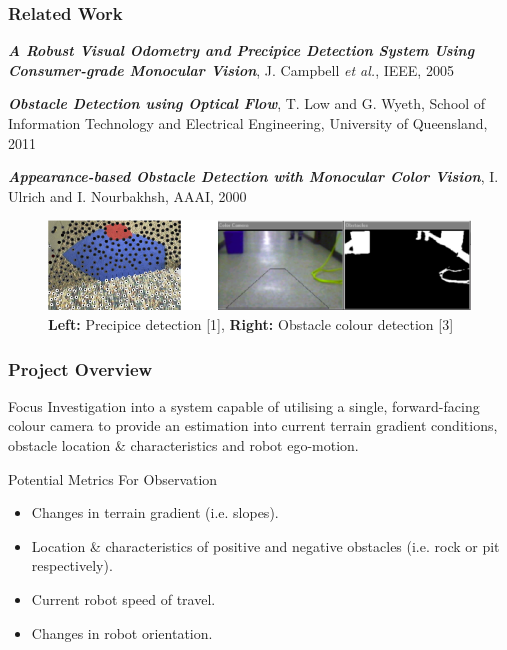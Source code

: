 \documentclass[10pt, compress]{beamer}
\begin{document}
\begin{frame}[fragile]
  \frametitle{Related Work}
  
  	\begin{enumerate}[label={[\arabic*]}]
  	
  		\item \textbf{\textit{A Robust Visual Odometry and Precipice Detection
System Using Consumer-grade Monocular Vision}}, J. Campbell \textit{et al.}, IEEE, 2005

		\item \textbf{\textit{Obstacle Detection using Optical Flow}}, T. Low and G. Wyeth, School of Information Technology and Electrical Engineering, University of Queensland, 2011
		
		\item \textbf{\textit{Appearance-based Obstacle Detection with Monocular Color Vision}}, I. Ulrich and I. Nourbakhsh, AAAI, 2000
  			
  	\end{enumerate}
  	
  	\vspace{5pt}
  	
  	
  	\begin{figure}[ht!]
\centering
\includegraphics[scale=0.3]{related_work.png}
    \caption{\textbf{Left:} Precipice detection [1], \textbf{Right:} Obstacle colour detection [3]}
  \end{figure}

  	
\end{frame}

\begin{frame}[fragile]
  \frametitle{Project Overview}
  
  \begin{block}{Focus}
    Investigation into a system capable of utilising a single, forward-facing colour camera to provide an estimation into current terrain gradient conditions, obstacle location \& characteristics and robot ego-motion. 
  \end{block}
  
  
  \begin{block}{Potential Metrics For Observation}
   
  \begin{itemize}[label={\textbullet}]
  	\item Changes in terrain gradient (i.e. slopes).
  	\item Location \& characteristics of positive and negative obstacles (i.e. rock or pit respectively).
  	\item Current robot speed of travel.
  	\item Changes in robot orientation.
  \end{itemize}
  
 \end{block}
 
\end{frame}
\end{document}
